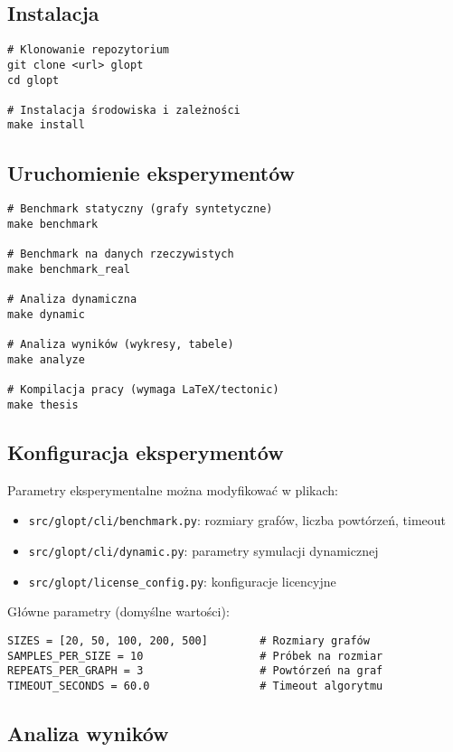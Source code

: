 \subsection{Instalacja}

\begin{verbatim}
# Klonowanie repozytorium
git clone <url> glopt
cd glopt

# Instalacja środowiska i zależności
make install
\end{verbatim}

\subsection{Uruchomienie eksperymentów}

\begin{verbatim}
# Benchmark statyczny (grafy syntetyczne)
make benchmark

# Benchmark na danych rzeczywistych
make benchmark_real

# Analiza dynamiczna
make dynamic

# Analiza wyników (wykresy, tabele)
make analyze

# Kompilacja pracy (wymaga LaTeX/tectonic)
make thesis
\end{verbatim}

\subsection{Konfiguracja eksperymentów}

Parametry eksperymentalne można modyfikować w plikach:
\begin{itemize}
\item \texttt{src/glopt/cli/benchmark.py}: rozmiary grafów, liczba powtórzeń, timeout
\item \texttt{src/glopt/cli/dynamic.py}: parametry symulacji dynamicznej
\item \texttt{src/glopt/license\_config.py}: konfiguracje licencyjne
\end{itemize}

Główne parametry (domyślne wartości):
\begin{verbatim}
SIZES = [20, 50, 100, 200, 500]        # Rozmiary grafów
SAMPLES_PER_SIZE = 10                  # Próbek na rozmiar
REPEATS_PER_GRAPH = 3                  # Powtórzeń na graf
TIMEOUT_SECONDS = 60.0                 # Timeout algorytmu
\end{verbatim}

\subsection{Analiza wyników}

